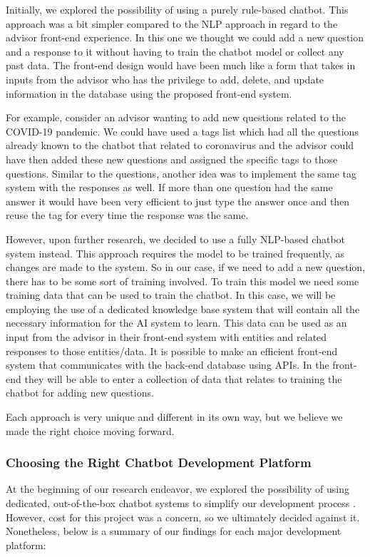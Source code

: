 \documentclass[titlepage, 12pt]{article}
\begin{document}
Initially, we explored the possibility of using a purely rule-based chatbot. This approach was a bit simpler compared to the NLP approach in regard to the advisor front-end experience. In this one we thought we could add a new question and a response to it without having to train the chatbot model or collect any past data. The front-end design would have been much like a form that takes in inputs from the advisor who has the privilege to add, delete, and update information in the database using the proposed front-end system.

For example, consider an advisor wanting to add new questions related to the COVID-19 pandemic. We could have used a tags list which had all the questions already known to the chatbot that related to coronavirus and the advisor could have then added these new questions and assigned the specific tags to those questions. Similar to the questions, another idea was to implement the same tag system with the responses as well. If more than one question had the same answer it would have been very efficient to just type the answer once and then reuse the tag for every time the response was the same.

However, upon further research, we decided to use a fully NLP-based chatbot system instead. This approach requires the model to be trained frequently, as changes are made to the system. So in our case, if we need to add a new question, there has to be some sort of training involved. To train this model we need some training data that can be used to train the chatbot. In this case, we will be employing the use of a dedicated knowledge base system that will contain all the necessary information for the AI system to learn. This data can be used as an input from the advisor in their front-end system with entities and related responses to those entities/data. It is possible to make an efficient front-end system that communicates with the back-end database using APIs. In the front-end they will be able to enter a collection of data that relates to training the chatbot for adding new questions.

Each approach is very unique and different in its own way, but we believe we made the right choice moving forward.


\subsubsection{Choosing the Right Chatbot Development Platform}

At the beginning of our research endeavor, we explored the possibility of using dedicated, out-of-the-box chatbot systems to simplify our development process \cite{bib-2-13}. However, cost for this project was a concern, so we ultimately decided against it. Nonetheless, below is a summary of our findings for each major development platform:
\end{document}
